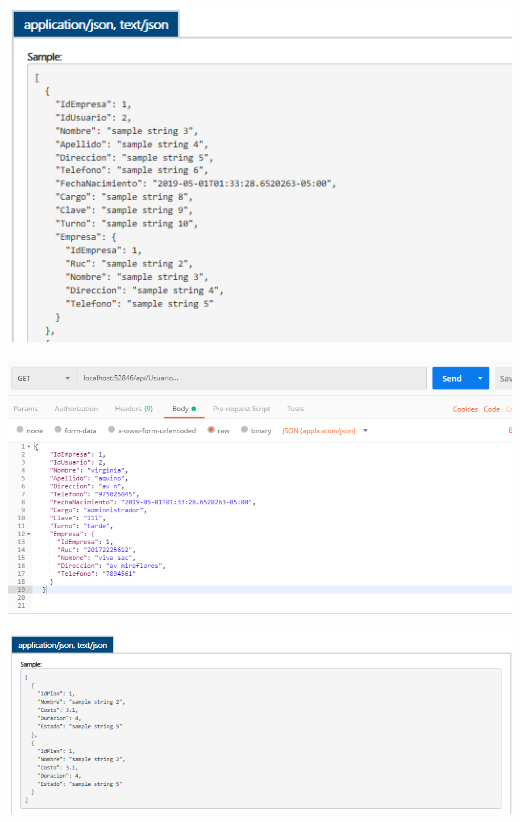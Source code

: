 \begin{center}
			\includegraphics[width=15cm]{./Imagenes/6}
             \end{center}
        \begin{center}
			\includegraphics[width=15cm]{./Imagenes/7}
             \end{center}
\begin{center}
			\includegraphics[width=15cm]{./Imagenes/8}
             \end{center}
        
